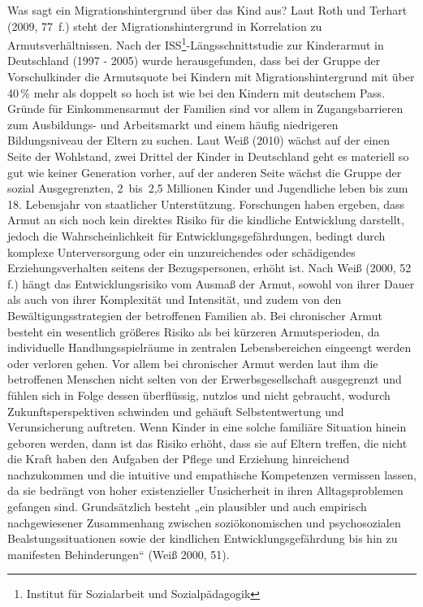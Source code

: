 Was sagt ein Migrationshintergrund über das Kind aus? Laut Roth und Terhart (2009, 77~f.) steht der Migrationshintergrund in Korrelation zu Armutsverhältnissen. 
Nach der ISS\footnote{Institut für Sozialarbeit und Sozialpädagogik}-Längsschnittstudie zur Kinderarmut in Deutschland (1997 - 2005) wurde herausgefunden, dass bei der Gruppe der Vorschulkinder die Armutsquote bei Kindern mit Migrationshintergrund mit über 40\,\% mehr als doppelt so hoch ist wie bei den Kindern mit deutschem Pass. Gründe für Einkommensarmut der Familien sind vor allem in Zugangsbarrieren zum Ausbildungs- und Arbeitsmarkt und einem häufig niedrigeren Bildungsniveau der Eltern zu suchen. 
Laut Weiß (2010) wächst auf der einen Seite der Wohlstand, zwei Drittel der Kinder in Deutschland geht es materiell so gut wie keiner Generation vorher, auf der anderen Seite wächst die Gruppe der sozial Ausgegrenzten, 2~bis~2,5 Millionen Kinder und Jugendliche leben bis zum 18. Lebensjahr von staatlicher Unterstützung. 
Forschungen haben ergeben, dass Armut an sich noch kein direktes Risiko für die kindliche Entwicklung darstellt, jedoch die Wahrscheinlichkeit für Entwicklungsgefährdungen, bedingt durch komplexe Unterversorgung oder ein unzureichendes oder schädigendes Erziehungsverhalten seitens der Bezugspersonen, erhöht ist. 
Nach Weiß (2000, 52 f.) hängt das Entwicklungsrisiko vom Ausmaß der Armut, sowohl von ihrer Dauer als auch von ihrer Komplexität und Intensität, und zudem von den Bewältigungsstrategien der betroffenen Familien ab. Bei chronischer Armut besteht ein wesentlich größeres Risiko als bei kürzeren Armutsperioden, da individuelle Handlungsspielräume in zentralen Lebensbereichen eingeengt werden oder verloren gehen.
Vor allem bei chronischer Armut werden laut ihm die betroffenen Menschen nicht selten von der Erwerbsgesellschaft ausgegrenzt und fühlen sich in Folge dessen überflüssig, nutzlos und nicht gebraucht, wodurch Zukunftsperspektiven schwinden und gehäuft Selbstentwertung und Verunsicherung auftreten. Wenn Kinder in eine solche familiäre Situation hinein geboren werden, dann ist das Risiko erhöht, dass sie auf Eltern treffen, die nicht die Kraft haben den Aufgaben der Pflege und Erziehung hinreichend nachzukommen und die intuitive und empathische Kompetenzen vermissen lassen, da sie bedrängt von hoher existenzieller Unsicherheit in ihren Alltagsproblemen gefangen sind.   
Grundsätzlich besteht „ein plausibler und auch empirisch nachgewiesener Zusammenhang zwischen soziökonomischen und psychosozialen Bealstungssituationen sowie der kindlichen Entwicklungsgefährdung bis hin zu manifesten Behinderungen“ (Weiß 2000, 51).

